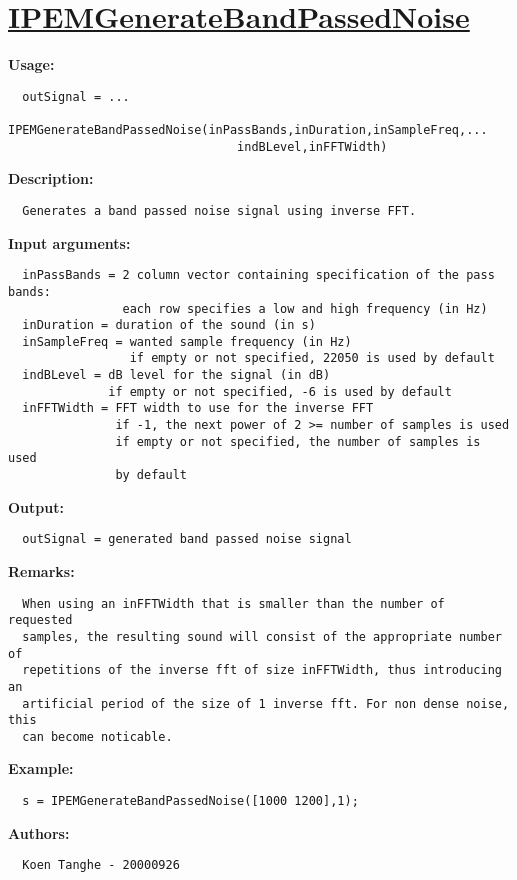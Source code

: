 \newpage
\section*{\hyperlink{Concepts:IPEMGenerateBandPassedNoise}{IPEMGenerateBandPassedNoise}}
\hypertarget{FuncRef:IPEMGenerateBandPassedNoise}{}

\textbf{Usage:}
\begin{verbatim}  outSignal = ...
    IPEMGenerateBandPassedNoise(inPassBands,inDuration,inSampleFreq,...
                                indBLevel,inFFTWidth)

\end{verbatim}
\textbf{Description:}
\begin{verbatim}  Generates a band passed noise signal using inverse FFT.

\end{verbatim}
\textbf{Input arguments:}
\begin{verbatim}  inPassBands = 2 column vector containing specification of the pass bands:
                each row specifies a low and high frequency (in Hz)
  inDuration = duration of the sound (in s)
  inSampleFreq = wanted sample frequency (in Hz)
                 if empty or not specified, 22050 is used by default
  indBLevel = dB level for the signal (in dB)
              if empty or not specified, -6 is used by default
  inFFTWidth = FFT width to use for the inverse FFT
               if -1, the next power of 2 >= number of samples is used
               if empty or not specified, the number of samples is used
               by default

\end{verbatim}
\textbf{Output:}
\begin{verbatim}  outSignal = generated band passed noise signal

\end{verbatim}
\textbf{Remarks:}
\begin{verbatim}  When using an inFFTWidth that is smaller than the number of requested
  samples, the resulting sound will consist of the appropriate number of
  repetitions of the inverse fft of size inFFTWidth, thus introducing an
  artificial period of the size of 1 inverse fft. For non dense noise, this
  can become noticable.

\end{verbatim}
\textbf{Example:}
\begin{verbatim}  s = IPEMGenerateBandPassedNoise([1000 1200],1);

\end{verbatim}
\textbf{Authors:}
\begin{verbatim}  Koen Tanghe - 20000926
\end{verbatim}


